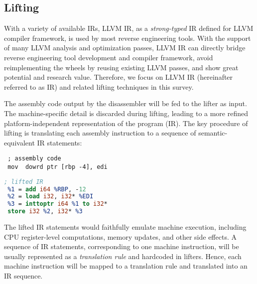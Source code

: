\subsection{Lifting} \label{sec:background-lifting}

With a variety of available IRs, LLVM IR, as a \textit{strong-typed} IR
defined for LLVM compiler framework, is used by most reverse engineering
tools. With the support of many LLVM analysis and optimization passes, LLVM IR
can directly bridge reverse engineering tool development and compiler
framework, avoid reimplementing the wheels by reusing existing LLVM passes,
and show great potential and research value. Therefore, we focus on LLVM IR
(hereinafter referred to as IR) and related lifting techniques in this survey.

The assembly code output by the disassembler will be fed to the lifter as
input. The machine-specific detail is discarded during lifting, leading to a
more refined platform-independent representation of the program (IR). The key
procedure of lifting is translating each assembly instruction to a sequence of
semantic-equivalent IR statements:

\vspace*{3pt}
\noindent\hspace*{36pt}\begin{minipage}{.40\linewidth}
\begin{lstlisting}
 ; assembly code
 mov  dowrd ptr [rbp -4], edi
\end{lstlisting}
\end{minipage}\hspace*{24pt}
\begin{minipage}{.40\linewidth}
\begin{lstlisting}[language=llvm]
 ; lifted IR
 %1 = add i64 %RBP, -12
 %2 = load i32, i32* %EDI
 %3 = inttoptr i64 %1 to i32*
 store i32 %2, i32* %3
\end{lstlisting}
\end{minipage}

The lifted IR statements would faithfully emulate machine execution, including
CPU register-level computations, memory updates, and other side effects. A
sequence of IR statements, corresponding to one machine instruction, will be
usually represented as a \textit{translation rule} and hardcoded in lifters.
Hence, each machine instruction will be mapped to a translation rule and
translated into an IR sequence.

